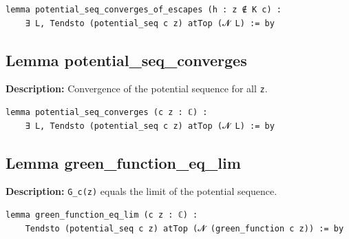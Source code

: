 \begin{lstlisting}[language=Lean]
lemma potential_seq_converges_of_escapes (h : z ∉ K c) :
    ∃ L, Tendsto (potential_seq c z) atTop (𝓝 L) := by
\end{lstlisting}

\subsection*{Lemma potential\_seq\_converges}
\textbf{Description:} Convergence of the potential sequence for all \texttt{z}.

\begin{lstlisting}[language=Lean]
lemma potential_seq_converges (c z : ℂ) :
    ∃ L, Tendsto (potential_seq c z) atTop (𝓝 L) := by
\end{lstlisting}

\subsection*{Lemma green\_function\_eq\_lim}
\textbf{Description:} \texttt{G\_c(z)} equals the limit of the potential sequence.

\begin{lstlisting}[language=Lean]
lemma green_function_eq_lim (c z : ℂ) :
    Tendsto (potential_seq c z) atTop (𝓝 (green_function c z)) := by
\end{lstlisting}

